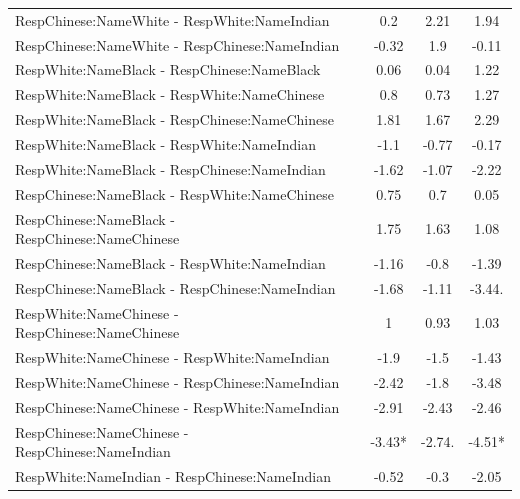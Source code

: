 \documentclass[]{report}
\begin{document}
\begin{table}
{\begin{tabular}[t]{lcccc}
		RespChinese:NameWhite - RespWhite:NameIndian &  & 0.2 & 2.21 & 1.94 \\ 
		RespChinese:NameWhite - RespChinese:NameIndian &  & -0.32 & 1.9 & -0.11 \\ 
		RespWhite:NameBlack - RespChinese:NameBlack &  & 0.06 & 0.04 & 1.22 \\ 
		RespWhite:NameBlack - RespWhite:NameChinese &  & 0.8 & 0.73 & 1.27 \\ 
		RespWhite:NameBlack - RespChinese:NameChinese &  & 1.81 & 1.67 & 2.29 \\ 
		RespWhite:NameBlack - RespWhite:NameIndian &  & -1.1 & -0.77 & -0.17 \\ 
		RespWhite:NameBlack - RespChinese:NameIndian &  & -1.62 & -1.07 & -2.22 \\ 
		RespChinese:NameBlack - RespWhite:NameChinese &  & 0.75 & 0.7 & 0.05 \\ 
		RespChinese:NameBlack - RespChinese:NameChinese &  & 1.75 & 1.63 & 1.08 \\ 
		RespChinese:NameBlack - RespWhite:NameIndian &  & -1.16 & -0.8 & -1.39 \\ 
		RespChinese:NameBlack - RespChinese:NameIndian &  & -1.68 & -1.11 & -3.44. \\ 
		RespWhite:NameChinese - RespChinese:NameChinese &  & 1 & 0.93 & 1.03 \\ 
		RespWhite:NameChinese - RespWhite:NameIndian &  & -1.9 & -1.5 & -1.43 \\ 
		RespWhite:NameChinese - RespChinese:NameIndian &  & -2.42 & -1.8 & -3.48 \\ 
		RespChinese:NameChinese - RespWhite:NameIndian &  & -2.91 & -2.43 & -2.46 \\ 
		RespChinese:NameChinese - RespChinese:NameIndian &  & -3.43* & -2.74. & -4.51* \\ 
		RespWhite:NameIndian - RespChinese:NameIndian &  & -0.52 & -0.3 & -2.05 \\ 
		\hline
	\end{tabular}}
\end{table}
\end{document}

